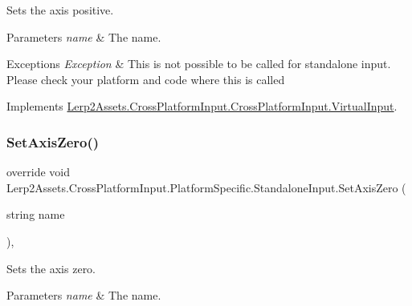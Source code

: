 Sets the axis positive. 


\begin{DoxyParams}{Parameters}
{\em name} & The name.\\
\hline
\end{DoxyParams}

\begin{DoxyExceptions}{Exceptions}
{\em Exception} & This is not possible to be called for standalone input. Please check your platform and code where this is called\\
\hline
\end{DoxyExceptions}


Implements \hyperlink{class_lerp2_assets_1_1_cross_platform_input_1_1_cross_platform_input_1_1_virtual_input_a5a8ad2347e4e25f7ccd55939346e1b69}{Lerp2\+Assets.\+Cross\+Platform\+Input.\+Cross\+Platform\+Input.\+Virtual\+Input}.

\mbox{\label{class_lerp2_assets_1_1_cross_platform_input_1_1_platform_specific_1_1_standalone_input_afb7577a7f8192004d1c29860de5eb503}} 
\subsubsection{\texorpdfstring{Set\+Axis\+Zero()}{SetAxisZero()}}
{\footnotesize\ttfamily override void Lerp2\+Assets.\+Cross\+Platform\+Input.\+Platform\+Specific.\+Standalone\+Input.\+Set\+Axis\+Zero (\begin{DoxyParamCaption}\item[{string}]{name }\end{DoxyParamCaption})\hspace{0.3cm}{\ttfamily [inline]}, {\ttfamily [virtual]}}



Sets the axis zero. 


\begin{DoxyParams}{Parameters}
{\em name} & The name.\\
\hline
\end{DoxyParams}

